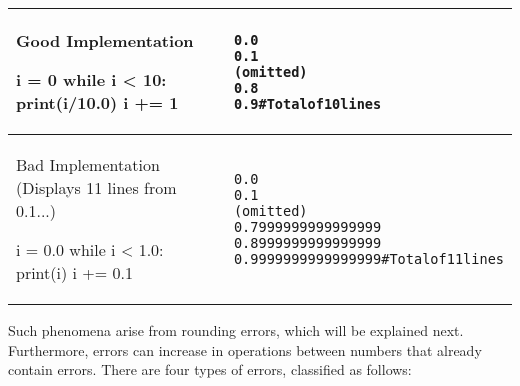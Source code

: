 \begin{center}
\begin{tabular}{ll}\hline
  \begin{minipage}{.4\linewidth}
Good Implementation
\begin{pybox}
i = 0
while i < 10:
  print(i/10.0)
  i += 1
\end{pybox}    
  \end{minipage}
  &
  \begin{minipage}{.5\linewidth}
\begin{alltt}
0.0
0.1
(omitted)
0.8
0.9  # Total of 10 lines
\end{alltt}
  \end{minipage}
  \\\hline
  \begin{minipage}{.4\linewidth}
Bad Implementation
(Displays 11 lines from 0.1...)
\begin{pybox}
i = 0.0
while i < 1.0:
  print(i)
  i += 0.1
\end{pybox}
  \end{minipage}
  &
  \begin{minipage}{.5\linewidth}
\begin{alltt}
0.0
0.1
(omitted)
0.7999999999999999
0.8999999999999999
0.9999999999999999     # Total of 11 lines
\end{alltt}
  \end{minipage}
\\\hline\end{tabular}
\end{center}

Such phenomena arise from rounding errors, which will be explained next.
Furthermore, errors can increase in operations between numbers that already contain errors. There are four types of errors, classified as follows:

